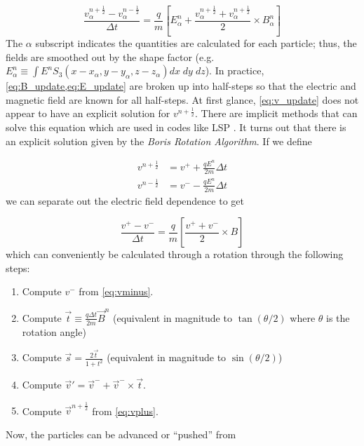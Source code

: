 \begin{equation}
	\frac{v^{n + \frac{1}{2}}_\alpha - v^{n - \frac{1}{2}}_\alpha}{\Delta t} = \frac{q}{m}[E^n_\alpha + \frac{v^{n + \frac{1}{2}}_\alpha + v^{n + \frac{1}{2}}_\alpha}{2} \times B^n_\alpha] \label{eq:v_update}
\end{equation}
The $\alpha$ subscript indicates the quantities are calculated for each particle; thus, the fields are smoothed out by the shape factor (e.g. $E^n_\alpha \equiv \int E^n S_3(x-x_\alpha, y-y_\alpha, z-z_\alpha) dx \; dy \; dz$). In practice, \cref{eq:B_update,eq:E_update} are broken up into half-steps so that the electric and magnetic field are known for all half-steps. At first glance, \cref{eq:v_update} does not appear to have an explicit solution for $v^{n + \frac{1}{2}}$. There are implicit methods that can solve this equation which are used in codes like \gls{LSP} \cite{Welch_2004_LSP}. It turns out that there is an explicit solution given by the \emph{Boris Rotation Algorithm}. If we define 

\begin{align}
	v^{n + \frac{1}{2}} &= v^+ + \frac{q E^n}{2 m} \Delta t \label{eq:vplus} \\
	v^{n - \frac{1}{2}} &= v^- - \frac{q E^n}{2 m} \Delta t \label{eq:vminus}
\end{align}
we can separate out the electric field dependence to get 

\begin{equation}
	\frac{v^+ - v^-}{\Delta t} = \frac{q}{m}[\frac{v^+ + v^-}{2} \times B]
\end{equation}
which can conveniently be calculated through a rotation \cite{Birdsall_2004_PIC} through the following steps:

\begin{enumerate}
	\item Compute $v^-$ from \cref{eq:vminus}.
	\item Compute $\vec{t} \equiv \frac{q \Delta t}{2 m} \vec{B}^n $ (equivalent in magnitude to $\tan(\theta/2)$ where $\theta$ is the rotation angle)
	\item Compute $\vec{s} = \frac{2 \vec{t}}{1 + t^2}$ (equivalent in magnitude to $\sin(\theta/2)$)
	\item Compute $\vec{v}' = \vec{v}^- + \vec{v}^- \times \vec{t}$.
	\item Compute $\vec{v}^{n+\frac{1}{2}}$ from \cref{eq:vplus}.
\end{enumerate}
Now, the particles can be advanced or ``pushed'' from

